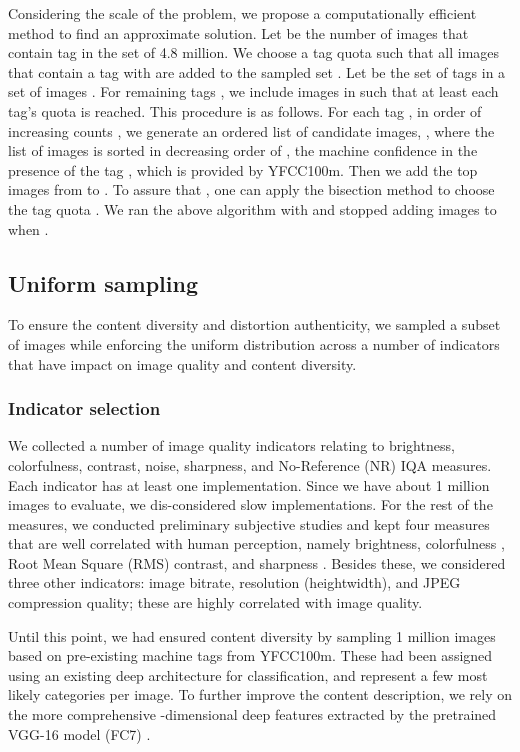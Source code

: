 \documentclass{article}
\begin{document}
Considering the scale of the problem, we propose a computationally efficient method to find an approximate solution. Let  be the number of images that contain tag  in the set  of 4.8 million. We choose a tag quota  such that all images that contain a tag  with  are added to the sampled set . Let  be the set of tags in a set of images .  For remaining tags , we include images in  such that at least each tag's quota  is reached. This procedure is as follows. For each tag , in  order of increasing counts , 
we generate an ordered list of candidate images, , where the list of images is sorted in decreasing order of  , the machine confidence in the presence of the tag , which is provided by YFCC100m. Then we add the top  images from  to . To assure that , one can apply the bisection method to choose the tag quota . We ran the above algorithm with  and stopped adding images to  when .



\subsection{Uniform sampling}



To ensure the content diversity and distortion authenticity, we sampled a subset of images while enforcing the uniform distribution across a number of indicators that have impact on image quality and content diversity.


\subsubsection{Indicator selection}
We collected a number of image quality indicators relating to brightness, colorfulness, contrast, noise, sharpness, and No-Reference (NR) IQA measures. Each indicator has at least one implementation. Since we have about 1 million images to evaluate, we dis-considered slow implementations. For the rest of the measures, we conducted preliminary subjective studies and kept four measures that are well correlated with human perception, namely brightness, colorfulness \cite{Hasler:2003}, Root Mean Square (RMS) contrast, and sharpness \cite{Vu:2012}. Besides these, we considered three other indicators: image  bitrate, resolution (heightwidth), and JPEG compression quality; these are highly correlated with image quality.  



Until this point, we had ensured content diversity by sampling 1 million images based on pre-existing machine tags from YFCC100m. These had been assigned using an existing deep architecture for classification, and represent a few most likely categories per image. To further improve the content description, we rely on the more comprehensive -dimensional deep features extracted by the pretrained VGG-16 model (FC7) \cite{Simonyan:14c}.
\end{document}
